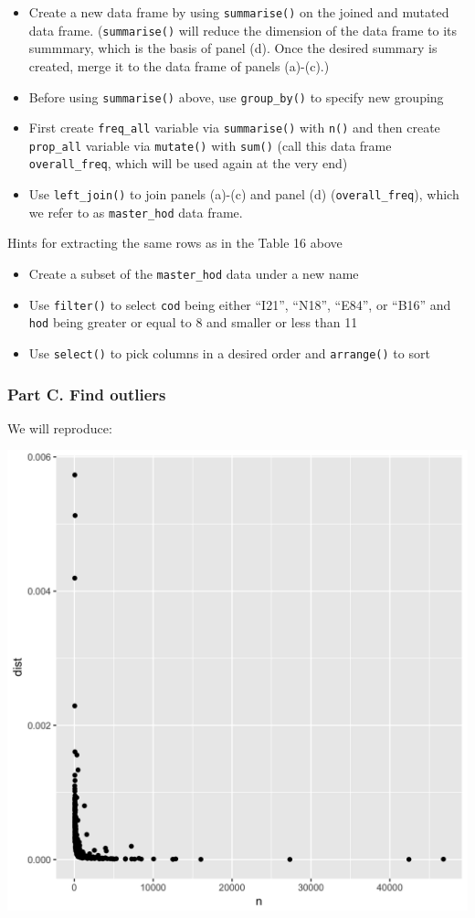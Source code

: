 \documentclass[]{book}
\theoremstyle{definition}
\theoremstyle{definition}
\theoremstyle{remark}
\begin{document}
\begin{itemize}
\item
  Create a new data frame by using \texttt{summarise()} on the joined
  and mutated data frame. (\texttt{summarise()} will reduce the
  dimension of the data frame to its summmary, which is the basis of
  panel (d). Once the desired summary is created, merge it to the data
  frame of panels (a)-(c).)
\item
  Before using \texttt{summarise()} above, use \texttt{group\_by()} to
  specify new grouping
\item
  First create \texttt{freq\_all} variable via \texttt{summarise()} with
  \texttt{n()} and then create \texttt{prop\_all} variable via
  \texttt{mutate()} with \texttt{sum()} (call this data frame
  \texttt{overall\_freq}, which will be used again at the very end)
\item
  Use \texttt{left\_join()} to join panels (a)-(c) and panel (d)
  (\texttt{overall\_freq}), which we refer to as \texttt{master\_hod}
  data frame.
\end{itemize}

Hints for extracting the same rows as in the Table 16 above

\begin{itemize}
\item
  Create a subset of the \texttt{master\_hod} data under a new name
\item
  Use \texttt{filter()} to select \texttt{cod} being either ``I21'',
  ``N18'', ``E84'', or ``B16'' and \texttt{hod} being greater or equal
  to 8 and smaller or less than 11
\item
  Use \texttt{select()} to pick columns in a desired order and
  \texttt{arrange()} to sort
\end{itemize}

\subsubsection*{Part C. Find outliers}\label{part-c.-find-outliers}

We will reproduce:

\begin{center}\includegraphics[width=0.5\linewidth]{tidy_case_study/n-dist-raw} \end{center}
\end{document}
